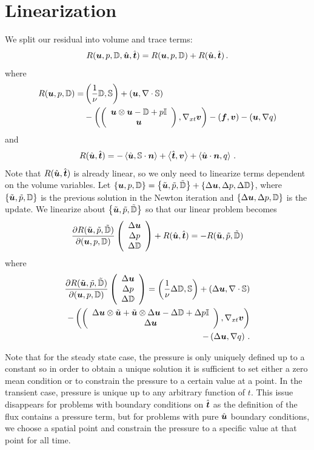 \documentclass[Dissertation.tex]{subbIles}
\begin{document}
\section{Linearization}
We split our residual into volume and trace terms:
\[
R(\boldsymbol u,p,\mathbb{D},\hat{\boldsymbol u},\hat{\boldsymbol t})=R(\boldsymbol u,p,\mathbb{D})+R(\hat{\boldsymbol u},\hat{\boldsymbol t})\,.
\]
where
\begin{align*}
R(\boldsymbol u,p,\mathbb{D})=&
  \left( \frac{1}{\nu}\mathbb{D},\mathbb{S} \right)
  +\left( \boldsymbol u,\nabla\cdot\mathbb{S} \right)
  \\&
  -\left( \left( \begin{array}{c} \boldsymbol u\otimes\boldsymbol u-\mathbb{D}+p\mathbb{I}\\ \boldsymbol u\\ \end{array} \right),\nabla_{xt}\boldsymbol v \right)
  -(\boldsymbol f,\boldsymbol v)
  -\left( \boldsymbol u,\nabla q \right)
\end{align*}
and
\begin{align*}
R(\hat{\boldsymbol u},\hat{\boldsymbol t})=
  -\left\langle \hat{\boldsymbol u},\mathbb{S}\cdot\boldsymbol n \right\rangle
  +\left\langle \hat{\boldsymbol t},\boldsymbol v \right\rangle
  +\left\langle \hat{\boldsymbol u}\cdot\boldsymbol n,q \right\rangle\,.
\end{align*}
Note that $R(\hat{\boldsymbol u},\hat{\boldsymbol t})$ is already linear, so we only need to linearize terms dependent on 
the volume variables. Let 
$\left\{ \boldsymbol u,p,\mathbb{D} \right\}=\left\{ \tilde{\boldsymbol u},\tilde p,\tilde{\mathbb{D}} \right\}+\left\{ \Delta\boldsymbol u,\Delta p,\Delta\mathbb{D} \right\}$,
where $\left\{ \tilde{\boldsymbol u},\tilde p,\mathbb{D} \right\}$ is the previous solution in the Newton iteration 
and $\left\{ \Delta\boldsymbol u,\Delta p,\mathbb{D} \right\}$ is the update.
We linearize about $\left\{ \tilde{\boldsymbol u},\tilde p,\tilde{\mathbb{D}} \right\}$ so that our linear problem becomes
\[
\frac{\partial R(\tilde{\boldsymbol u},\tilde p,\tilde{\mathbb{D}})}{\partial(\boldsymbol u,p,\mathbb{D})}\left( \begin{array}{c} \Delta\boldsymbol u\\ \Delta p\\ \Delta\mathbb{D}\\ \end{array} \right)+R(\hat{\boldsymbol u},\hat{\boldsymbol t})
=-R(\tilde{\boldsymbol u},\tilde p,\tilde{\mathbb{D}})
\]
where 
\begin{align*}
\frac{\partial R(\tilde{\boldsymbol u},\tilde p,\tilde{\mathbb{D}})}{\partial(\boldsymbol u,p,\mathbb{D})}\left( \begin{array}{c} \Delta\boldsymbol u\\ \Delta p\\ \Delta\mathbb{D}\\ \end{array} \right)=
  \left( \frac{1}{\nu}\Delta\mathbb{D},\mathbb{S} \right)
  +\left( \Delta\boldsymbol u,\nabla\cdot\mathbb{S} \right)
  \\
  -\left( \left( \begin{array}{c} \Delta\boldsymbol u\otimes\tilde{\boldsymbol u}+\tilde{\boldsymbol u}\otimes\Delta\boldsymbol u-\Delta\mathbb{D}+\Delta p\mathbb{I}\\ \Delta\boldsymbol u\\ \end{array} \right),\nabla_{xt}\boldsymbol v \right)
  \\
  -\left( \Delta\boldsymbol u,\nabla q \right)\,.
\end{align*}

Note that for the steady state case, the pressure is only uniquely defined up to a constant
so in order to obtain a unique solution it is sufficient to set either a zero mean condition
or to constrain the pressure to a certain value at a point.
In the transient case, pressure is unique up to any arbitrary function of $t$.
This issue disappears for problems with boundary conditions on $\hat{\boldsymbol t}$ as the definition 
of the flux contains a pressure term, but for problems with pure $\hat{\boldsymbol u}$ boundary conditions,
we choose a spatial point and constrain the pressure to a specific value at that point for all time.
\end{document}
